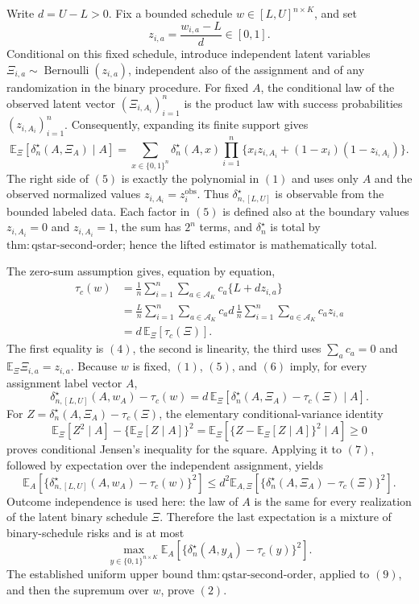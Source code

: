 Write \(d=U-L>0\). Fix a bounded schedule \(w\in[L,U]^{n\times K}\), and set
\[
z_{i,a}=\frac{w_{i,a}-L}{d}\in[0,1].
\tag{4}
\]
Conditional on this fixed schedule, introduce independent latent variables \(\Xi_{i,a}\sim\operatorname{Bernoulli}(z_{i,a})\), independent also of the assignment and of any randomization in the binary procedure. For fixed \(A\), the conditional law of the observed latent vector \((\Xi_{i,A_i})_{i=1}^n\) is the product law with success probabilities \((z_{i,A_i})_{i=1}^n\). Consequently, expanding its finite support gives
\[
\mathbb E_{\Xi}\!\left[\delta_n^\star(A,\Xi_A)\mid A\right]
=\sum_{x\in\{0,1\}^n}\delta_n^\star(A,x)
 \prod_{i=1}^n\{x_i z_{i,A_i}+(1-x_i)(1-z_{i,A_i})\}.
\tag{5}
\]
The right side of \((5)\) is exactly the polynomial in \((1)\) and uses only \(A\) and the observed normalized values \(z_{i,A_i}=z_i^{\mathrm{obs}}\). Thus \(\delta_{n,[L,U]}^\star\) is observable from the bounded labeled data. Each factor in \((5)\) is defined also at the boundary values \(z_{i,A_i}=0\) and \(z_{i,A_i}=1\), the sum has \(2^n\) terms, and \(\delta_n^\star\) is total by \(\mathrm{thm:qstar\text{-}second\text{-}order}\); hence the lifted estimator is mathematically total.

The zero-sum assumption gives, equation by equation,
\[
\begin{aligned}
\tau_c(w)
&=\frac1n\sum_{i=1}^n\sum_{a\in\mathcal A_K}
 c_a\{L+d z_{i,a}\}\\
&=\frac Ln\sum_{i=1}^n\sum_{a\in\mathcal A_K}c_a
  d\,\frac1n\sum_{i=1}^n\sum_{a\in\mathcal A_K}c_a z_{i,a}\\
&=d\,\mathbb E_{\Xi}\!\left[\tau_c(\Xi)\right].
\end{aligned}
\tag{6}
\]
The first equality is \((4)\), the second is linearity, the third uses \(\sum_a c_a=0\) and \(\mathbb E_\Xi\Xi_{i,a}=z_{i,a}\). Because \(w\) is fixed, \((1)\), \((5)\), and \((6)\) imply, for every assignment label vector \(A\),
\[
\delta_{n,[L,U]}^\star(A,w_A)-\tau_c(w)
=d\,\mathbb E_{\Xi}\!\left[
 \delta_n^\star(A,\Xi_A)-\tau_c(\Xi)\mid A
\right].
\tag{7}
\]
For
\(Z=\delta_n^\star(A,\Xi_A)-\tau_c(\Xi)\), the elementary conditional-variance identity
\[
\mathbb E_\Xi[Z^2\mid A]-\{\mathbb E_\Xi[Z\mid A]\}^2
=\mathbb E_\Xi\!\left[
 \{Z-\mathbb E_\Xi[Z\mid A]\}^2\mid A
\right]\ge0
\]
proves conditional Jensen's inequality for the square. Applying it to \((7)\), followed by expectation over the independent assignment, yields
\[
\mathbb E_A\!\left[
 \{\delta_{n,[L,U]}^\star(A,w_A)-\tau_c(w)\}^2
\right]
\le d^2\mathbb E_{A,\Xi}\!\left[
 \{\delta_n^\star(A,\Xi_A)-\tau_c(\Xi)\}^2
\right].
\tag{8}
\]
Outcome independence is used here: the law of \(A\) is the same for every realization of the latent binary schedule \(\Xi\). Therefore the last expectation is a mixture of binary-schedule risks and is at most
\[
\max_{y\in\{0,1\}^{n\times K}}
\mathbb E_A\!\left[
 \{\delta_n^\star(A,y_A)-\tau_c(y)\}^2
\right].
\tag{9}
\]
The established uniform upper bound \(\mathrm{thm:qstar\text{-}second\text{-}order}\), applied to \((9)\), and then the supremum over \(w\), prove \((2)\).


